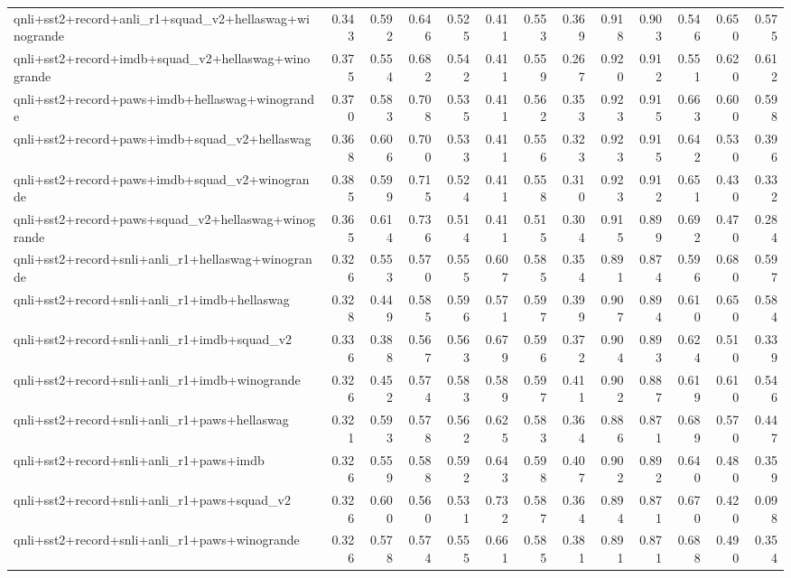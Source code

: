 \begin{table}[t]
\begin{tabular}{lrrrrrrrrrrrr}
    qnli+sst2+record+anli\_r1+squad\_v2+hellaswag+winogrande & 0.343 & 0.592 & 0.646 & 0.525 & 0.411 & 0.553 & 0.369 & 0.918 & 0.903 & 0.546 & 0.650 & 0.575 \\
    qnli+sst2+record+imdb+squad\_v2+hellaswag+winogrande & 0.375 & 0.554 & 0.682 & 0.542 & 0.411 & 0.559 & 0.267 & 0.920 & 0.912 & 0.551 & 0.620 & 0.612 \\
    qnli+sst2+record+paws+imdb+hellaswag+winogrande & 0.370 & 0.583 & 0.708 & 0.535 & 0.411 & 0.562 & 0.353 & 0.923 & 0.915 & 0.663 & 0.600 & 0.598 \\
    qnli+sst2+record+paws+imdb+squad\_v2+hellaswag & 0.368 & 0.606 & 0.700 & 0.533 & 0.411 & 0.556 & 0.323 & 0.923 & 0.915 & 0.642 & 0.530 & 0.396 \\
    qnli+sst2+record+paws+imdb+squad\_v2+winogrande & 0.385 & 0.599 & 0.715 & 0.524 & 0.411 & 0.558 & 0.310 & 0.923 & 0.912 & 0.651 & 0.430 & 0.332 \\
    qnli+sst2+record+paws+squad\_v2+hellaswag+winogrande & 0.365 & 0.614 & 0.736 & 0.514 & 0.411 & 0.515 & 0.304 & 0.915 & 0.899 & 0.692 & 0.470 & 0.284 \\
    qnli+sst2+record+snli+anli\_r1+hellaswag+winogrande & 0.326 & 0.553 & 0.570 & 0.555 & 0.607 & 0.585 & 0.354 & 0.891 & 0.874 & 0.596 & 0.680 & 0.597 \\
    qnli+sst2+record+snli+anli\_r1+imdb+hellaswag & 0.328 & 0.449 & 0.585 & 0.596 & 0.571 & 0.597 & 0.399 & 0.907 & 0.894 & 0.610 & 0.650 & 0.584 \\
    qnli+sst2+record+snli+anli\_r1+imdb+squad\_v2 & 0.336 & 0.388 & 0.567 & 0.563 & 0.679 & 0.596 & 0.372 & 0.904 & 0.893 & 0.624 & 0.510 & 0.339 \\
    qnli+sst2+record+snli+anli\_r1+imdb+winogrande & 0.326 & 0.452 & 0.574 & 0.583 & 0.589 & 0.597 & 0.411 & 0.902 & 0.887 & 0.619 & 0.610 & 0.546 \\
    qnli+sst2+record+snli+anli\_r1+paws+hellaswag & 0.321 & 0.593 & 0.578 & 0.562 & 0.625 & 0.583 & 0.364 & 0.886 & 0.871 & 0.689 & 0.570 & 0.447 \\
    qnli+sst2+record+snli+anli\_r1+paws+imdb & 0.326 & 0.559 & 0.588 & 0.592 & 0.643 & 0.598 & 0.407 & 0.902 & 0.892 & 0.640 & 0.480 & 0.359 \\
    qnli+sst2+record+snli+anli\_r1+paws+squad\_v2 & 0.326 & 0.600 & 0.560 & 0.531 & 0.732 & 0.587 & 0.364 & 0.894 & 0.871 & 0.670 & 0.420 & 0.098 \\
    qnli+sst2+record+snli+anli\_r1+paws+winogrande & 0.326 & 0.578 & 0.574 & 0.555 & 0.661 & 0.585 & 0.381 & 0.891 & 0.871 & 0.688 & 0.490 & 0.354 \\

\end{tabular}
\end{table}

